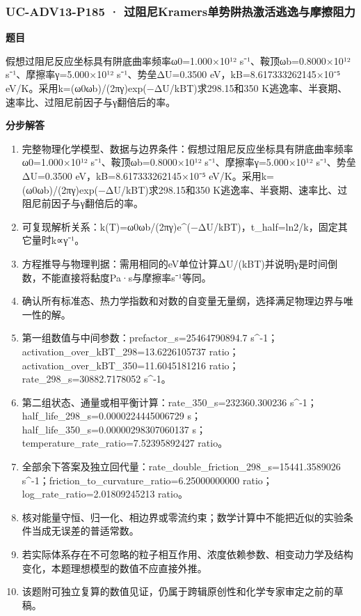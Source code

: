 \documentclass[UTF8,11pt,a4paper]{ctexart}
\begin{document}
\subsubsection*{UC-ADV13-P185 · 过阻尼Kramers单势阱热激活逃逸与摩擦阻力}
\noindent\textbf{题目}\par
假想过阻尼反应坐标具有阱底曲率频率ω0=1.000×10¹² s⁻¹、鞍顶ωb=0.8000×10¹² s⁻¹、摩擦率γ=5.000×10¹² s⁻¹、势垒ΔU=0.3500 eV，kB=8.617333262145×10⁻⁵ eV/K。采用k=(ω0ωb)/(2πγ)exp(−ΔU/kBT)求298.15和350 K逃逸率、半衰期、速率比、过阻尼前因子与γ翻倍后的率。\par
\medskip\noindent\textbf{分步解答}
\begin{enumerate}
\item 完整物理化学模型、数据与边界条件：假想过阻尼反应坐标具有阱底曲率频率ω0=1.000×10¹² s⁻¹、鞍顶ωb=0.8000×10¹² s⁻¹、摩擦率γ=5.000×10¹² s⁻¹、势垒ΔU=0.3500 eV，kB=8.617333262145×10⁻⁵ eV/K。采用k=(ω0ωb)/(2πγ)exp(−ΔU/kBT)求298.15和350 K逃逸率、半衰期、速率比、过阻尼前因子与γ翻倍后的率。
\item 可复现解析关系：k(T)=ω0ωb/(2πγ)e\textasciicircum{}(−ΔU/kBT)，t\_half=ln2/k，固定其它量时k∝γ⁻¹。
\item 方程推导与物理判据：需用相同的eV单位计算ΔU/(kBT)并说明γ是时间倒数，不能直接将黏度Pa·s与摩擦率s⁻¹等同。
\item 确认所有标准态、热力学指数和对数的自变量无量纲，选择满足物理边界与唯一性的解。
\item 第一组数值与中间参数：prefactor\_s=25464790894.7 s\textasciicircum{}-1；activation\_over\_kBT\_298=13.6226105737 ratio；activation\_over\_kBT\_350=11.6045181216 ratio；rate\_298\_s=30882.7178052 s\textasciicircum{}-1。
\item 第二组状态、通量或相平衡计算：rate\_350\_s=232360.300236 s\textasciicircum{}-1；half\_life\_298\_s=0.0000224445006729 s；half\_life\_350\_s=0.00000298307060137 s；temperature\_rate\_ratio=7.52395892427 ratio。
\item 全部余下答案及独立回代量：rate\_double\_friction\_298\_s=15441.3589026 s\textasciicircum{}-1；friction\_to\_curvature\_ratio=6.25000000000 ratio；log\_rate\_ratio=2.01809245213 ratio。
\item 核对能量守恒、归一化、相边界或零流约束；数学计算中不能把近似的实验条件当成无误差的普适常数。
\item 若实际体系存在不可忽略的粒子相互作用、浓度依赖参数、相变动力学及结构变化，本题理想模型的数值不应直接外推。
\item 该题附可独立复算的数值见证，仍属于跨辑原创性和化学专家审定之前的草稿。
\end{enumerate}
\end{document}

